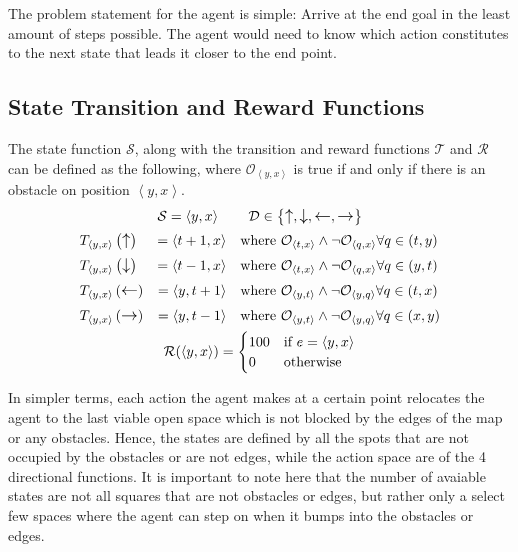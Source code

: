 The problem statement for the agent is simple: Arrive at the end goal in the least amount of steps possible. The agent would need to know which action constitutes to the next state that leads it closer to the end point.

\newcommand{\coor}[2]{\left\langle #1, #2 \right\rangle}
\newcommand{\yx}{\coor{y}{x}}
\newcommand{\obs}{\mathcal{O}}
\newcommand{\state}{\mathcal{S}}
\newcommand{\reward}{\mathcal{R}}

\subsection{State Transition and Reward Functions}
The state function $\state$, along with the transition and reward functions $\mathcal{T}$ and $\reward$ can be defined as the following, where $\obs_{\yx}$ is true if and only if there is an obstacle on position $\yx$.
\begin{gather*}
	\state = \yx \qquad \mathcal{D} \in \left\{ \upa, \downa, \lefta, \righta \right\} \\
	\begin{aligned}
		&T_{\yx}\left(\upa\right) &= \coor{t + 1}{x} &&&\text{where } \obs_{\coor{t}{x}} \wedge \neg \obs_{\coor{q}{x}} \forall q \in \left(t, y\right) \\
		&T_{\yx}\left(\downa\right) &= \coor{t - 1}{x} &&&\text{where } \obs_{\coor{t}{x}} \wedge \neg \obs_{\coor{q}{x}} \forall q \in \left(y, t\right) \\
		&T_{\yx}\left(\lefta\right) &= \coor{y}{t + 1} &&&\text{where } \obs_{\coor{y}{t}} \wedge \neg \obs_{\coor{y}{q}} \forall q \in \left(t, x\right) \\
		&T_{\yx}\left(\righta\right) &= \coor{y}{t - 1} &&&\text{where } \obs_{\coor{y}{t}} \wedge \neg \obs_{\coor{y}{q}} \forall q \in \left(x, y\right)
	\end{aligned} \\
	\reward(\yx) = \begin{cases}
		100 & \text{if } e = \yx \\
		0 & \text{otherwise}
	\end{cases}
\end{gather*}

In simpler terms, each action the agent makes at a certain point relocates the agent to the last viable open space which is not blocked by the edges of the map or any obstacles. Hence, the states are defined by all the spots that are not occupied by the obstacles or are not edges, while the action space are of the 4 directional functions. It is important to note here that the number of avaiable states are not all squares that are not obstacles or edges, but rather only a select few spaces where the agent can step on when it bumps into the obstacles or edges.

